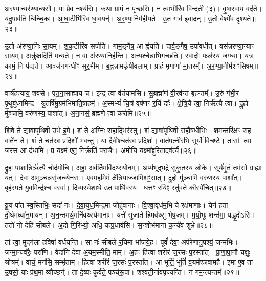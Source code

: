 अर॑ण्या॒न्यर॑ण्यान्य॒सौ।
या प्रेव॒ नश्य॑सि।
क॒था ग्रामं॒ न पृ॑च्छसि।
न त्वा॒भीरि॑व विन्दती (३)।
वृ॒षा॒र॒वाय॒ वद॑ते।
यदु॒पाव॑ति चिच्चि॒कः।
आ॒घा॒टीभि॑रिव धा॒वयन्॑।
अ॒र॒ण्या॒निर्म॑हीयते।
उ॒त गाव॑ इवादन्।
उ॒तो वेश्मे॑व दृश्यते॥२३॥

उ॒तो अ॑रण्या॒निः सा॒यम्।
श॒क॒टीरि॑व सर्जति।
गाम॒ङ्गैष॒ आ ह्व॑यति।
दार्व॒ङ्गैष॒ उपा॑वधीत्।
वस॑न्नरण्या॒न्याꣳ सा॒यम्।
अक्रु॑क्ष॒दिति॑ मन्यते।
न वा अ॑रण्या॒निर्\mbox{}ह॑न्ति।
अ॒न्यश्चेन्नाभि॒गच्छ॑ति।
स्वा॒दोः फल॑स्य ज॒ग्ध्वा।
यत्र॒ कामं॒ नि प॑द्यते।
आञ्ज॑नगन्धीꣳ सुर॒भीम्।
ब॒ह्व॒न्नामकृ॑षीवलाम्।
प्राहं मृ॒गाणां᳚ मा॒तरम्᳚।
अ॒र॒ण्या॒नीम॑शꣳसिषम्॥२४॥\anuvakamend[स्या॒म॒ रु॒रो॒ह॒ यु॒वा॒नः॒ शु॒न्ध्यूरि॒च्छमा॑नो दृश्यते॒ निप॑द्यते च॒त्वारि॑ च]

वार्त्र॑हत्याय॒ शव॑से।
पृ॒त॒ना॒साह्या॑य च।
इन्द्र॒ त्वा व॑र्तयामसि।
सु॒ब्रह्मा॑णं वी॒रव॑न्तं बृ॒हन्तम्᳚।
उ॒रुं ग॑भी॒रं पृ॒थुबु॑ध्नमिन्द्र।
श्रु॒तर्\mbox{}षि॑मु॒ग्रम॑भिमाति॒षाहम्᳚।
अ॒स्मभ्यं॑ चि॒त्रं वृष॑णꣳ र॒यिं दाः᳚।
क्षे॒त्रि॒यै त्वा॒ निर्\mbox{}ऋ॑त्यै त्वा।
द्रु॒हो मु॑ञ्चामि॒ वरु॑णस्य॒ पाशा᳚त्।
अ॒ना॒गसं॒ ब्रह्म॑णे त्वा करोमि॥२५॥

शि॒वे ते॒ द्यावा॑पृथि॒वी उ॒भे इ॒मे।
शं ते॑ अ॒ग्निः स॒हाद्भिर॑स्तु।
शं द्यावा॑पृथि॒वी स॒हौष॑धीभिः।
शम॒न्तरि॑क्षꣳ स॒ह वाते॑न ते।
शं ते॒ चत॑स्रः प्र॒दिशो॑ भवन्तु।
या दैवी॒श्चत॑स्रः प्र॒दिशः॑।
वात॑पत्नीर॒भि सूर्यो॑ विच॒ष्टे।
तासां त्वा ज॒रस॒ आ द॑धामि।
प्र यक्ष्म॑ एतु॒ निर्\mbox{}ऋ॑तिं परा॒चैः।
अमो॑चि॒ यक्ष्मा᳚द्दुरि॒तादव॑र्त्यै॥२६॥

द्रु॒हः पाशा॒न्निर्\mbox{}ऋ॑त्यै॒ चोद॑मोचि।
अहा॒ अव॑र्ति॒मवि॑दथ्स्यो॒नम्।
अप्य॑भूद्भ॒द्रे सु॑कृ॒तस्य॑ लो॒के।
सूर्य॑मृ॒तं तम॑सो॒ ग्राह्या॒ यत्।
दे॒वा अमु॑ञ्च॒न्नसृ॑ज॒न्व्ये॑नसः।
ए॒वम॒हमि॒मं क्षे᳚त्रि॒याज्जा॑मिश॒ꣳ॒सात्।
द्रु॒हो मु॑ञ्चामि॒ वरु॑णस्य॒ पाशा᳚त्।
बृह॑स्पते यु॒वमिन्द्र॑श्च॒ वस्वः॑।
दि॒व्यस्ये॑शाथे उ॒त पार्थि॑वस्य।
ध॒त्तꣳ र॒यिꣴ स्तु॑व॒ते की॒रये॑चित्॥२७॥

यू॒यं पा॑त स्व॒स्तिभिः॒ सदा॑ नः।
दे॒वा॒युध॒मिन्द्र॒मा जोहु॑वानाः।
वि॒श्वा॒वृध॑म॒भि ये रक्ष॑माणाः।
येन॑ ह॒ता दी॒र्घमध्वा॑न॒मायन्॑।
अ॒न॒न्तमर्थ॒मनि॑वर्थ्स्यमानाः।
यत्ते॑ सुजाते हि॒मव॑थ्सु भेष॒जम्।
म॒यो॒भूः शन्त॑मा॒ यद्धृ॒दो\-ऽसि॑।
ततो॑ नो देहि सीबले।
अ॒दो गि॒रिभ्यो॒ अधि॒ यत्प्र॒धाव॑सि।
स॒ꣳ॒शोभ॑माना क॒न्ये॑व शुभ्रे॥२८॥

तां त्वा॒ मुद्ग॑ला ह॒विषा॑ वर्धयन्ति।
सा नः॑ सीबले र॒यिमा भा॑जये॒ह।
पूर्वं॑ देवा॒ अप॑रेणानु॒पश्यं॒ जन्म॑भिः।
जन्मा॒न्यव॑रैः॒ परा॑णि।
वेदा॑नि देवा अ॒यम॒स्मीति॒ माम्।
अ॒हꣳ हि॒त्वा शरी॑रं ज॒रसः॑ प॒रस्ता᳚त्।
प्रा॒णा॒पा॒नौ चक्षुः॒ श्रोत्रम्᳚।
वाचं॒ मन॑सि॒ सम्भृ॑ताम्।
हि॒त्वा शरी॑रं ज॒रसः॑ प॒रस्ता᳚त्।
आ भूतिं॒ भूतिं॑ व॒यम॑श्ञवामहै।
इ॒मा ए॒व ता उ॒षसो॒ याः प्र॑थ॒मा व्यौच्छन्॑।
ता दे॒व्यः॑ कुर्वते॒ पञ्च॑रू॒पा।
शश्व॑ती॒र्नाव॑पृज्यन्ति।
न ग॑म॒न्त्यन्तम्᳚॥२९॥\anuvakamend[क॒रो॒म्यव॑र्त्यै चिच्छुभ्रे\-ऽश्ञवामहै च॒त्वारि॑ च]

